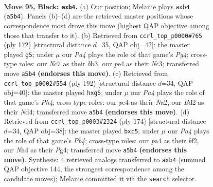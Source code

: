 \documentclass[11pt]{article}
\begin{document}
\clearpage

\begin{figure}[p]\centering
\begin{subfigure}{0.46\textwidth}\centering
\resizebox{\linewidth}{!}{%
\newchessgame
\chessboard[
  setfen={5k2/1Nn5/8/p7/PP2P2n/3Bp3/K2b3p/8 b - - 0 95},
  showmover=false,
  pgfstyle=straightmove, color=movearrow, markmove={a5-b4}
]}
\caption{}
\end{subfigure}\hfill
\begin{subfigure}{0.46\textwidth}\centering
\resizebox{\linewidth}{!}{%
\newchessgame
\chessboard[
  setfen={8/4b1k1/2R3p1/4pp2/6PP/1bN5/6K1/8 w - - 0 87},
  showmover=false,
  pgfstyle=straightmove, color=movearrow, markmove={g4-g5}
]}
\caption{}
\end{subfigure}
\\[4pt]
\begin{subfigure}{0.46\textwidth}\centering
\resizebox{\linewidth}{!}{%
\newchessgame
\chessboard[
  setfen={4k3/8/6p1/b5p1/3Nb2P/4P3/N4K2/8 w - - 0 97},
  showmover=false,
  pgfstyle=straightmove, color=movearrow, markmove={h4-g5}
]}
\caption{}
\end{subfigure}\hfill
\begin{subfigure}{0.46\textwidth}\centering
\resizebox{\linewidth}{!}{%
\newchessgame
\chessboard[
  setfen={8/4k3/7p/1Kp4P/1P2BpP1/8/5b2/8 w - - 0 88},
  showmover=false,
  pgfstyle=straightmove, color=movearrow, markmove={b4-c5}
]}
\caption{}
\end{subfigure}
\caption{\textbf{Move 95, Black: \texttt{axb4}.} (a) Our position; Melanie plays \texttt{axb4} (\texttt{a5b4}). Panels (b)--(d) are the retrieved master positions whose correspondence most drove this move (highest QAP objective among those that transfer to it). (b) Retrieved from \texttt{ccrl\_top\_p0000\#765} (ply 172) [structural distance $d$=35, QAP obj=42]: the master played \texttt{g5}; under $\mu$ our \emph{Pa4} plays the role of that game's \emph{Pg4}; cross-type roles: our \emph{N}c7 as their \emph{b}b3, our \emph{p}e4 as their \emph{N}c3; transferred move \texttt{a5b4} \textbf{(endorses this move)}. (c) Retrieved from \texttt{ccrl\_top\_p0002\#554} (ply 192) [structural distance $d$=34, QAP obj=40]: the master played \texttt{hxg5}; under $\mu$ our \emph{Pa4} plays the role of that game's \emph{Ph4}; cross-type roles: our \emph{p}e4 as their \emph{N}a2, our \emph{B}d2 as their \emph{N}d4; transferred move \texttt{a5b4} \textbf{(endorses this move)}. (d) Retrieved from \texttt{ccrl\_top\_p0003\#2324} (ply 174) [structural distance $d$=34, QAP obj=38]: the master played \texttt{bxc5}; under $\mu$ our \emph{Pa4} plays the role of that game's \emph{Pb4}; cross-type roles: our \emph{p}a4 as their \emph{b}f2, our \emph{N}h4 as their \emph{P}g4; transferred move \texttt{a5b4} \textbf{(endorses this move)}. Synthesis: 4 retrieved analogs transferred to \texttt{axb4} (summed QAP objective 144, the strongest correspondence among the candidate moves); Melanie committed it via the \texttt{search} selector.}
\label{fig:thought-m189}
\end{figure}
\end{document}
